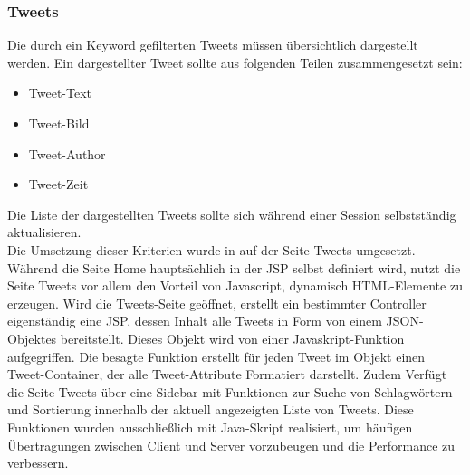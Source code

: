 \subsubsection*{Tweets}
Die durch ein Keyword gefilterten Tweets müssen übersichtlich dargestellt werden. Ein dargestellter 
Tweet sollte aus folgenden Teilen zusammengesetzt sein:
\begin{itemize}
\item{Tweet-Text}
\item{Tweet-Bild}
\item{Tweet-Author}
\item{Tweet-Zeit}
\end{itemize} 
Die Liste der dargestellten Tweets sollte sich  während einer Session selbstständig aktualisieren.\\
Die Umsetzung dieser Kriterien wurde in auf der Seite Tweets umgesetzt.\\
Während die Seite Home hauptsächlich in der JSP selbst definiert wird, nutzt die Seite Tweets vor 
allem den Vorteil von Javascript, dynamisch HTML-Elemente zu erzeugen. Wird die Tweets-Seite geöffnet, 
erstellt ein bestimmter Controller eigenständig eine JSP, dessen Inhalt alle Tweets in Form von einem 
JSON-Objektes bereitstellt. Dieses Objekt wird von einer Javaskript-Funktion aufgegriffen. Die besagte 
Funktion erstellt für jeden Tweet im Objekt einen Tweet-Container, der alle Tweet-Attribute Formatiert 
darstellt. Zudem Verfügt die Seite Tweets über eine Sidebar mit Funktionen zur Suche von Schlagwörtern 
und Sortierung innerhalb der aktuell angezeigten Liste von Tweets. Diese Funktionen wurden 
ausschließlich mit Java-Skript realisiert, um häufigen Übertragungen zwischen Client und Server 
vorzubeugen und die Performance zu verbessern.

